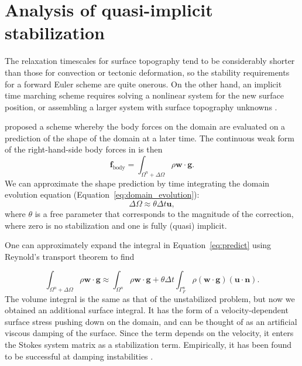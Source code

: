 \documentclass[preprint,12pt,authoryear]{elsarticle}
\begin{document}
\section{Analysis of quasi-implicit stabilization}
\label{sec:kmm}

The relaxation timescales for surface topography tend to be considerably shorter than those for 
convection or tectonic deformation, so the stability requirements for a forward Euler scheme
are quite onerous.  On the other hand, an implicit time marching scheme requires solving 
a nonlinear system for the new surface position, or assembling a larger system with surface
topography unknowns \citep[e.g.][]{kramer2012implicit}.

\citet{kaus2010stabilization} proposed a scheme whereby the body forces on the domain are 
evaluated on a prediction of the shape of the domain at a later time.
The continuous weak form of the right-hand-side body forces in is then
\begin{equation}
\mathbf{f}_{\mathrm{body}} = \int_{\Omega^n + \Delta \Omega} \rho \mathbf{w} \cdot \mathbf{g}.
\label{eq:predict}
\end{equation}
We can approximate the shape prediction by time integrating the domain evolution equation (Equation~\eqref{eq:domain_evolution}):
\begin{equation}
  \Delta \Omega \approx \theta \Delta t \mathbf{u},
\end{equation}
where $\theta$ is a free parameter that corresponds to the magnitude of the 
correction, where zero is no stabilization and one is fully (quasi) implicit.

One can approximately expand the integral in Equation~\eqref{eq:predict} using 
Reynold's transport theorem to find

\begin{equation}
\int_{\Omega^n + \Delta \Omega} \rho  \mathbf{w} \cdot \mathbf{g} \approx
\int_{\Omega^n} \rho  \mathbf{w} \cdot \mathbf{g} + \theta \Delta t \int_{\Gamma_F^n} \rho ( \mathbf{w \cdot g}) (\mathbf{u \cdot n} ).
\label{eq:kmm}
\end{equation}
The volume integral is the same as that of the unstabilized problem, but now we obtained an additional surface integral.
It has the form of a velocity-dependent surface stress pushing down on the 
domain, and can be thought of as an artificial viscous damping of the surface.
Since the term depends on the velocity, it enters the Stokes system matrix as a stabilization term.  
Empirically, it has been found to be successful at damping instabilities \citep{kaus2010stabilization, quinquis2011role, duretz2011discretization}.
\end{document}
